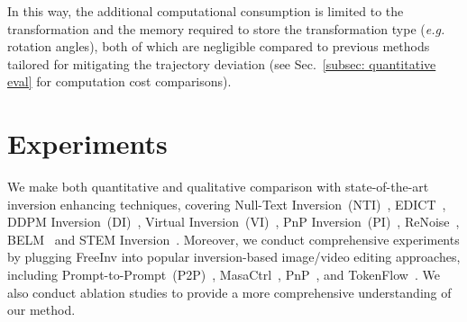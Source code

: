 \documentclass{article}
\begin{document}
In this way, the additional computational consumption is limited to the transformation and the memory required to store the transformation type (\emph{e.g.} rotation angles), both of which are negligible compared to previous methods tailored for mitigating the trajectory deviation (see Sec.~\ref{subsec: quantitative eval} for computation cost comparisons).

\section{Experiments}

We make both quantitative and qualitative comparison with state-of-the-art inversion enhancing techniques, covering Null-Text Inversion~(NTI)~\cite{mokady2022null}, EDICT~\cite{wallace2023edict}, DDPM Inversion~(DI)~\cite{huberman2024edit}, Virtual Inversion~(VI)~\cite{xu2023inversion}, PnP Inversion~(PI)~\cite{ju2024pnp}, ReNoise~\cite{garibi2024renoise}, BELM~\cite{wang2024belm} and STEM Inversion~\cite{li2024video}.
Moreover, we conduct comprehensive experiments by plugging FreeInv into popular inversion-based image/video editing approaches, including Prompt-to-Prompt~(P2P)~\cite{hertz2022prompt}, MasaCtrl~\cite{cao2023masactrl}, PnP~\cite{pnpDiffusion2023}, and TokenFlow~\cite{geyer2023tokenflow}.
We also conduct ablation studies to provide a more comprehensive understanding of our method. %
\end{document}
